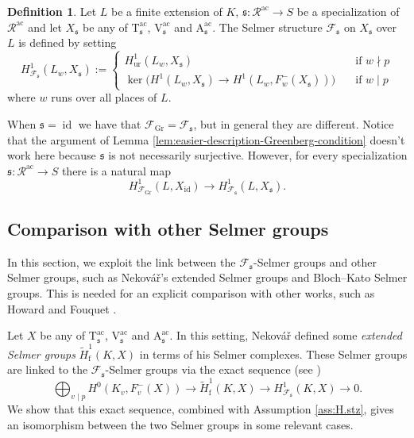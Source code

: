 \documentclass[12pt,reqno]{amsart}
\theoremstyle{definition}
\newtheorem{definition}[theorem]{Definition}
\theoremstyle{remark}
\newcommand{\V}{\boldsymbol{\mathrm{V}}}
\newcommand{\T}{\boldsymbol{\mathrm{T}}}
\newcommand{\calR}{\mathcal{R}}
\newcommand{\A}{\boldsymbol{\mathrm{A}}}
\DeclareMathOperator{\id}{id}
\newcommand{\ac}{\mathrm{ac}}
\newcommand{\Gr}{\mathrm{Gr}}
\newcommand{\f}{\mathrm{f}}
\newcommand{\ur}{\mathrm{ur}}
\newcommand{\sfrak}{\mathfrak{s}}
\begin{document}
\begin{definition}
        Let $L$ be a finite extension of $K$, $\sfrak\colon \calR^{\ac}\to S$ be a specialization of $\calR^\ac$ and let $X_\sfrak$ be any of $\T_{\mathfrak{s}}^{\ac}$, $\V_{\mathfrak{s}}^{\ac}$ and $\A_{\mathfrak{s}}^{\ac}$. The Selmer structure $\mathcal{F}_{\sfrak}$ on $X_\sfrak$ over $L$ is defined by setting 
        \begin{equation*}
            H^1_{\mathcal{F}_\sfrak}(L_w,X_\sfrak):=\begin{cases}
                H_{\ur}^1(L_w,X_\sfrak)\quad &\text{if $w\nmid p$}\\
                \ker\big(H^1(L_w,X_\sfrak)\to H^1(L_w,F_w^-(X_\sfrak))\big)\quad &\text{if $w\mid p$}
            \end{cases}
        \end{equation*}
        where $w$ runs over all places of $L$.
    \end{definition}

When $\sfrak=\id$ we have that $\mathcal{F}_\Gr=\mathcal{F}_{\sfrak}$, but in general they are different. Notice that the argument of Lemma \ref{lem:easier-description-Greenberg-condition} doesn't work here because $\sfrak$ is not necessarily surjective. However, for every specialization $\sfrak\colon \calR^{\ac}\to S$ there is a natural map
\begin{equation}\label{eq:Greenberg-and-sfrak-selmer-structure}
    H^1_{\mathcal{F}_\Gr}(L,X_{\id})\longrightarrow H^1_{\mathcal{F}_\sfrak}(L,X_\sfrak).
\end{equation}




\subsection{Comparison with other Selmer groups}

In this section, we exploit the link between the $\mathcal{F}_\sfrak$-Selmer groups and other Selmer groups, such as Nekov\' a\v r's extended Selmer groups and Bloch--Kato Selmer groups. This is needed for an explicit comparison with other works, such as Howard \cite{Howard04:heegner-point-kolyvagin-system} and Fouquet \cite{Fouquet13:Dihedral}.

Let $X$ be any of $\T_{\mathfrak{s}}^{\ac}$, $\V_{\mathfrak{s}}^{\ac}$ and $\A_{\mathfrak{s}}^{\ac}$. In this setting, Nekov\' a\v r defined some \emph{extended Selmer groups} $\tilde{H}^1_{\f}(K,X)$ in terms of his Selmer complexes. These Selmer groups are linked to the $\mathcal{F}_\sfrak$-Selmer groups via the exact sequence (see \cite[Lemma 9.6.3]{Nekovar06:selmer-complexes})
\begin{equation}\label{eq:Nekovar-exact-sequence}
    \bigoplus_{v\mid p} H^0(K_v, F_v^-(X))\to \tilde{H}^1_{\f}(K,X)\to H^1_{\mathcal{F}_\sfrak}(K,X)\to 0.
\end{equation}
We show that this exact sequence, combined with Assumption \ref{ass:H.stz}, gives an isomorphism between the two Selmer groups in some relevant cases.
\end{document}
